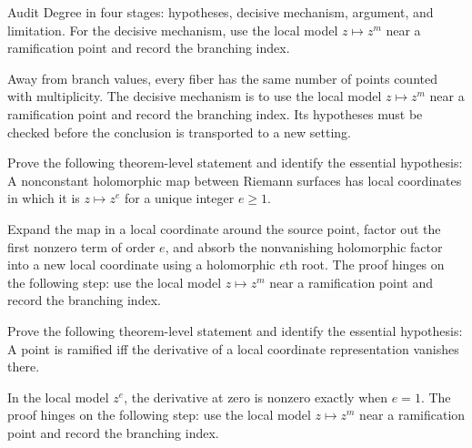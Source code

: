 \begin{problem}\label{prob:iv24-problem-08}
Audit Degree in four stages: hypotheses, decisive mechanism, argument, and limitation. For the decisive mechanism, use the local model \(z\mapsto z^m\) near a ramification point and record the branching index.
\end{problem}
\begin{solution}
Away from branch values, every fiber has the same number of points counted with multiplicity. The decisive mechanism is to use the local model \(z\mapsto z^m\) near a ramification point and record the branching index. Its hypotheses must be checked before the conclusion is transported to a new setting.
\end{solution}

\begin{problem}\label{prob:iv24-problem-09}
Prove the following theorem-level statement and identify the essential hypothesis: A nonconstant holomorphic map between Riemann surfaces has local coordinates in which it is $z\mapsto z^e$ for a unique integer $e\ge1$.
\end{problem}
\begin{solution}
Expand the map in a local coordinate around the source point, factor out the first nonzero term of order $e$, and absorb the nonvanishing holomorphic factor into a new local coordinate using a holomorphic $e$th root. The proof hinges on the following step: use the local model \(z\mapsto z^m\) near a ramification point and record the branching index.
\end{solution}

\begin{problem}\label{prob:iv24-problem-10}
Prove the following theorem-level statement and identify the essential hypothesis: A point is ramified iff the derivative of a local coordinate representation vanishes there.
\end{problem}
\begin{solution}
In the local model $z^e$, the derivative at zero is nonzero exactly when $e=1$. The proof hinges on the following step: use the local model \(z\mapsto z^m\) near a ramification point and record the branching index.
\end{solution}

